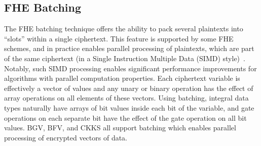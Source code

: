 


\subsection{FHE Batching}
The FHE batching technique offers the ability to pack several plaintexts into ``slots'' within a single ciphertext. This feature is supported by some FHE schemes, and in practice  enables parallel processing of plaintexts, which are part of the same ciphertext (in a Single Instruction Multiple Data (SIMD) style)~\cite{batching}. Notably, such SIMD processing enables significant performance improvements for algorithms with parallel computation properties.
Each ciphertext variable is effectively a vector of values and any unary or binary operation has the effect of array operations on all elements of these vectors. Using batching, integral data types naturally have arrays of bit values inside each bit of the variable, and gate operations on each separate bit have the effect of the gate operation on all bit values.
BGV, BFV, and CKKS all support batching which enables parallel processing of encrypted vectors of data.


